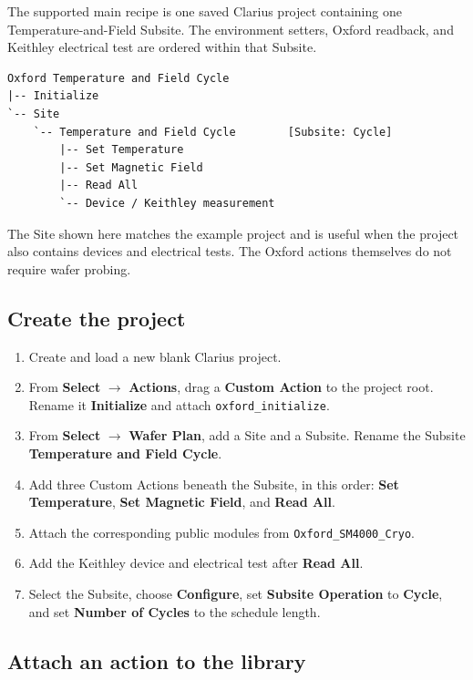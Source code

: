 \documentclass[10pt,a4paper]{article}
\newcommand{\api}[1]{\nolinkurl{#1}}
\begin{document}
The supported main recipe is one saved Clarius project containing one
Temperature-and-Field Subsite. The environment setters, Oxford readback, and
Keithley electrical test are ordered within that Subsite.

\begin{verbatim}
Oxford Temperature and Field Cycle
|-- Initialize
`-- Site
    `-- Temperature and Field Cycle        [Subsite: Cycle]
        |-- Set Temperature
        |-- Set Magnetic Field
        |-- Read All
        `-- Device / Keithley measurement
\end{verbatim}

The Site shown here matches the example project and is useful when the project
also contains devices and electrical tests. The Oxford actions themselves do
not require wafer probing.

\subsection{Create the project}

\begin{enumerate}
  \item Create and load a new blank Clarius project.
  \item From \textbf{Select} $\rightarrow$ \textbf{Actions}, drag a \textbf{Custom Action} to the
        project root. Rename it \textbf{Initialize} and attach
        \api{oxford_initialize}.
  \item From \textbf{Select} $\rightarrow$ \textbf{Wafer Plan}, add a Site and a Subsite. Rename
        the Subsite \textbf{Temperature and Field Cycle}.
  \item Add three Custom Actions beneath the Subsite, in this order:
        \textbf{Set Temperature}, \textbf{Set Magnetic Field}, and
        \textbf{Read All}.
  \item Attach the corresponding public modules from
        \api{Oxford_SM4000_Cryo}.
  \item Add the Keithley device and electrical test after \textbf{Read All}.
  \item Select the Subsite, choose \textbf{Configure}, set
        \textbf{Subsite Operation} to \textbf{Cycle}, and set
        \textbf{Number of Cycles} to the schedule length.
\end{enumerate}

\subsection{Attach an action to the library}
\end{document}

